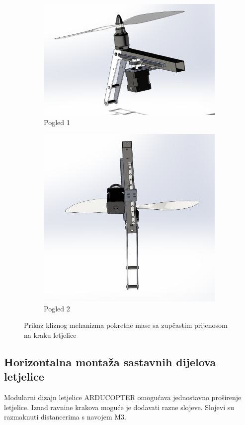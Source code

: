 \documentclass[11pt,a4paper]{article}
\begin{document}
\begin{figure}[H]
\centering
\begin{subfigure}{.5\textwidth}
  \centering
  \includegraphics[width=.9\linewidth]{figures/arm_assembly1.png}
  \caption{Pogled 1}
  \label{fig:sub1}
\end{subfigure}%
\begin{subfigure}{.5\textwidth}
  \centering
  \includegraphics[width=.9\linewidth]{figures/arm_assembly2.png}
  \caption{Pogled 2}
  \label{fig:sub2}
\end{subfigure}
\caption{Prikaz kliznog mehanizma pokretne mase sa zupčastim prijenosom na kraku letjelice}
\label{fig:arm_assembly}
\end{figure}

\subsection{Horizontalna montaža sastavnih dijelova letjelice}
Modularni dizajn letjelice ARDUCOPTER omogućava jednostavno proširenje letjelice. Iznad ravnine krakova moguće je dodavati razne slojeve. Slojevi su razmaknuti distancerima s navojem M3. 
\end{document}
